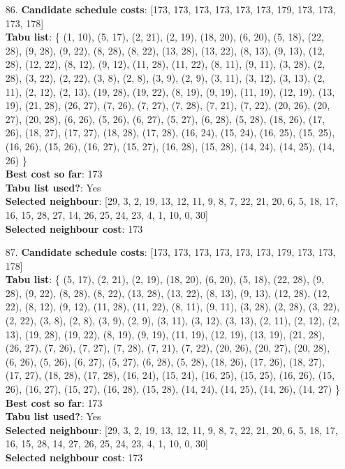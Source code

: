 \documentclass[fleqn]{article}
\begin{document}
\begin{itemize}
    \item[86.] \textbf{Candidate schedule costs}: [173, 173, 173, 173, 173, 173, 179, 173, 173, 173, 178] \\
    \textbf{Tabu list}: \{ (1, 10), (5, 17), (2, 21), (2, 19), (18, 20), (6, 20), (5, 18), (22, 28), (9, 28), (9, 22), (8, 28), (8, 22), (13, 28), (13, 22), (8, 13), (9, 13), (12, 28), (12, 22), (8, 12), (9, 12), (11, 28), (11, 22), (8, 11), (9, 11), (3, 28), (2, 28), (3, 22), (2, 22), (3, 8), (2, 8), (3, 9), (2, 9), (3, 11), (3, 12), (3, 13), (2, 11), (2, 12), (2, 13), (19, 28), (19, 22), (8, 19), (9, 19), (11, 19), (12, 19), (13, 19), (21, 28), (26, 27), (7, 26), (7, 27), (7, 28), (7, 21), (7, 22), (20, 26), (20, 27), (20, 28), (6, 26), (5, 26), (6, 27), (5, 27), (6, 28), (5, 28), (18, 26), (17, 26), (18, 27), (17, 27), (18, 28), (17, 28), (16, 24), (15, 24), (16, 25), (15, 25), (16, 26), (15, 26), (16, 27), (15, 27), (16, 28), (15, 28), (14, 24), (14, 25), (14, 26) \} \\
    \textbf{Best cost so far}: 173 \\
    \textbf{Tabu list used?}: Yes \\
    \textbf{Selected neighbour}: [29, 3, 2, 19, 13, 12, 11, 9, 8, 7, 22, 21, 20, 6, 5, 18, 17, 16, 15, 28, 27, 14, 26, 25, 24, 23, 4, 1, 10, 0, 30] \\
    \textbf{Selected neighbour cost}: 173
      

    \item[87.] \textbf{Candidate schedule costs}: [173, 173, 173, 173, 173, 173, 179, 173, 173, 178] \\
    \textbf{Tabu list}: \{ (5, 17), (2, 21), (2, 19), (18, 20), (6, 20), (5, 18), (22, 28), (9, 28), (9, 22), (8, 28), (8, 22), (13, 28), (13, 22), (8, 13), (9, 13), (12, 28), (12, 22), (8, 12), (9, 12), (11, 28), (11, 22), (8, 11), (9, 11), (3, 28), (2, 28), (3, 22), (2, 22), (3, 8), (2, 8), (3, 9), (2, 9), (3, 11), (3, 12), (3, 13), (2, 11), (2, 12), (2, 13), (19, 28), (19, 22), (8, 19), (9, 19), (11, 19), (12, 19), (13, 19), (21, 28), (26, 27), (7, 26), (7, 27), (7, 28), (7, 21), (7, 22), (20, 26), (20, 27), (20, 28), (6, 26), (5, 26), (6, 27), (5, 27), (6, 28), (5, 28), (18, 26), (17, 26), (18, 27), (17, 27), (18, 28), (17, 28), (16, 24), (15, 24), (16, 25), (15, 25), (16, 26), (15, 26), (16, 27), (15, 27), (16, 28), (15, 28), (14, 24), (14, 25), (14, 26), (14, 27) \} \\
    \textbf{Best cost so far}: 173 \\
    \textbf{Tabu list used?}: Yes \\
    \textbf{Selected neighbour}: [29, 3, 2, 19, 13, 12, 11, 9, 8, 7, 22, 21, 20, 6, 5, 18, 17, 16, 15, 28, 14, 27, 26, 25, 24, 23, 4, 1, 10, 0, 30] \\
    \textbf{Selected neighbour cost}: 173
      


\end{itemize}
\end{document}
